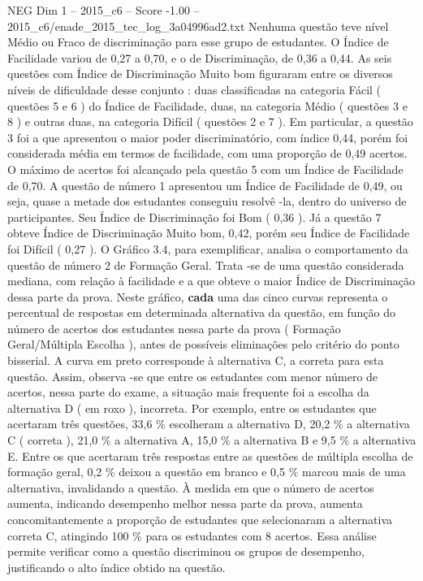 \begin{textsample}{NEG Dim 1 – 2015\_c6 – Score -1.00 – 2015\_c6/enade\_2015\_tec\_log\_3a04996ad2.txt}
Nenhuma questão teve nível Médio ou Fraco de discriminação para esse grupo de estudantes.
O Índice de Facilidade variou de 0,27 a 0,70, e o de Discriminação, de 0,36 a 0,44.
As seis questões com Índice de Discriminação Muito bom figuraram entre os diversos níveis de dificuldade desse conjunto : duas classificadas na categoria Fácil ( questões 5 e 6 ) do Índice de Facilidade, duas, na categoria Médio ( questões 3 e 8 ) e outras duas, na categoria Difícil ( questões 2 e 7 ).
Em particular, a questão 3 foi a que apresentou o maior poder discriminatório, com índice 0,44, porém foi considerada média em termos de facilidade, com uma proporção de 0,49 acertos.
O máximo de acertos foi alcançado pela questão 5 com um Índice de Facilidade de 0,70.
A questão de número 1 apresentou um Índice de Facilidade de 0,49, ou seja, quase a metade dos estudantes conseguiu resolvê -la, dentro do universo de participantes.
Seu Índice de Discriminação foi Bom ( 0,36 ).
Já a questão 7 obteve Índice de Discriminação Muito bom, 0,42, porém seu Índice de Facilidade foi Difícil ( 0,27 ).
O Gráfico 3.4, para exemplificar, analisa o comportamento da questão de número 2 de Formação Geral.
Trata -se de uma questão considerada mediana, com relação à facilidade e a que obteve o maior Índice de Discriminação dessa parte da prova.
Neste gráfico, \textbf{cada} uma das cinco curvas representa o percentual de respostas em determinada alternativa da questão, em função do número de acertos dos estudantes nessa parte da prova ( Formação Geral/Múltipla Escolha ), antes de possíveis eliminações pelo critério do ponto bisserial.
A curva em preto corresponde à alternativa C, a correta para esta questão.
Assim, observa -se que entre os estudantes com menor número de acertos, nessa parte do exame, a situação mais frequente foi a escolha da alternativa D ( em roxo ), incorreta.
Por exemplo, entre os estudantes que acertaram três questões, 33,6 \% escolheram a alternativa D, 20,2 \% a alternativa C ( correta ), 21,0 \% a alternativa A, 15,0 \% a alternativa B e 9,5 \% a alternativa E.
Entre os que acertaram três respostas entre as questões de múltipla escolha de formação geral, 0,2 \% deixou a questão em branco e 0,5 \% marcou mais de uma alternativa, invalidando a questão.
À medida em que o número de acertos aumenta, indicando desempenho melhor nessa parte da prova, aumenta concomitantemente a proporção de estudantes que selecionaram a alternativa correta C, atingindo 100 \% para os estudantes com 8 acertos.
Essa análise permite verificar como a questão discriminou os grupos de desempenho, justificando o alto índice obtido na questão.

\end{textsample}

